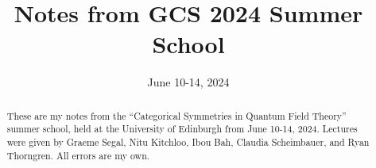 \documentclass{report}
\title{Notes from GCS 2024 Summer School}
\date{June 10-14, 2024}
\begin{document}
\maketitle

\begin{abstract}
	These are my notes from the ``Categorical Symmetries in Quantum Field Theory'' summer school, held at the University of Edinburgh from June 10-14, 2024.
	Lectures were given by Graeme Segal, Nitu Kitchloo, Ibou Bah, Claudia Scheimbauer, and Ryan Thorngren.
	All errors are my own.
\end{abstract}

\tableofcontents










\end{document}
